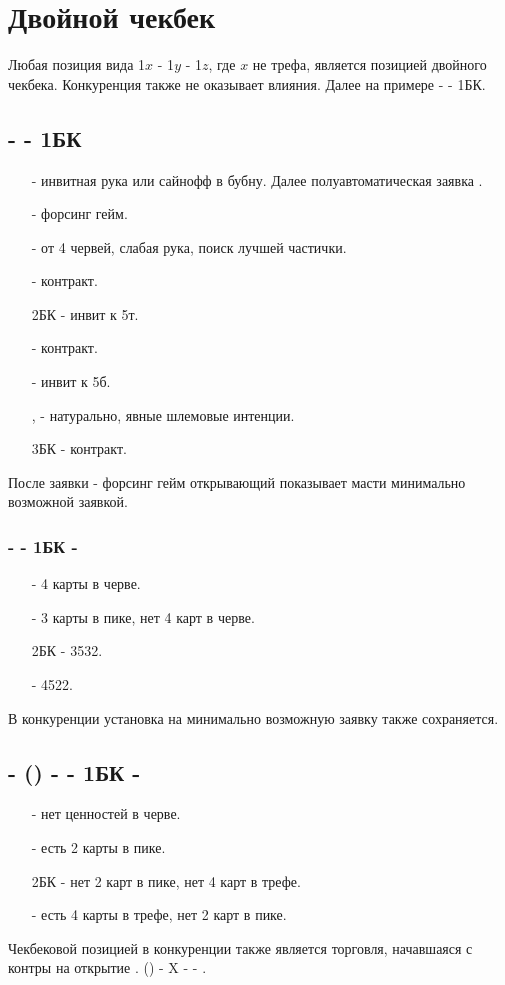 \documentclass{article}
\begin{document}
\section{Двойной чекбек}
Любая позиция вида 1$x$ - 1$y$ - 1$z$, где $x$ не трефа, является позицией двойного чекбека. Конкуренция также не оказывает влияния. Далее на примере  -  - 1БК.
\subsection{ -  - 1БК}
\begin{enumerate}
    \item[\cl{2}] - инвитная рука или сайнофф в бубну. Далее полуавтоматическая заявка .
    \item[\di{2}] - форсинг гейм.
    \item[\he{2}] - от 4 червей, слабая рука, поиск лучшей частички.
    \item[\sp{2}] - контракт.
    \item[2БК] - инвит к 5т.
    \item[\cl{3}] - контракт.
    \item[\di{3}] - инвит к 5б.
    \item[\he{3}, \sp{3}] - натурально, явные шлемовые интенции.
    \item[3БК] - контракт.
\end{enumerate}
После заявки  - форсинг гейм открывающий показывает масти минимально возможной заявкой.
\subsubsection{ -  - 1БК - }
\begin{enumerate}
    \item[\he{2}] - 4 карты в черве.
    \item[\sp{2}] - 3 карты в пике, нет 4 карт в черве.
    \item[2БК] - 3\cl{}5\di{}3\he{}2\sp{}.
    \item[\cl{3}] - 4\cl{}5\di{}2\he{}2\sp{}.
\end{enumerate}
В конкуренции установка на минимально возможную заявку также сохраняется.
\subsection{ - () -  - 1БК - }
\begin{enumerate}
    \item[\he{2}] - нет ценностей в черве.
    \item[\sp{2}] - есть 2 карты в пике.
    \item[2БК] - нет 2 карт в пике, нет 4 карт в трефе.
    \item[\cl{3}] - есть 4 карты в трефе, нет 2 карт в пике.
\end{enumerate}
Чекбековой позицией в конкуренции также является торговля, начавшаяся с контры на открытие .
() - X -  - . 
\end{document}
